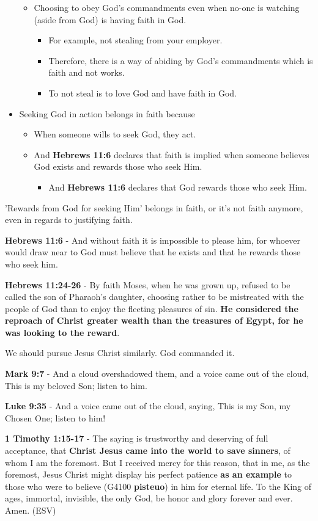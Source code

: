 \documentclass[11pt]{article}
\begin{document}
\begin{itemize}
\begin{itemize}
\item Choosing to obey God's commandments even when no-one is watching (aside from God) is having faith in God.
\begin{itemize}
\item For example, not stealing from your employer.
\item Therefore, there is a way of abiding by God's commandments which is faith and not works.
\item To not steal is to love God and have faith in God.
\end{itemize}
\end{itemize}
\item Seeking God in action belongs in faith because
\begin{itemize}
\item When someone wills to seek God, they act.
\item And \textbf{Hebrews 11:6} declares that faith is implied when someone believes God exists and rewards those who seek Him.
\begin{itemize}
\item And \textbf{Hebrews 11:6} declares that God rewards those who seek Him.
\end{itemize}
\end{itemize}
\end{itemize}

'Rewards from God for seeking Him' belongs in faith, or it's not faith anymore, even in regards to justifying faith.

\textbf{Hebrews 11:6} - And without faith it is impossible to please him, for whoever would draw near to God must believe that he exists and that he rewards those who seek him.

\textbf{Hebrews 11:24-26} - By faith Moses, when he was grown up, refused to be called the son of Pharaoh's daughter, choosing rather to be mistreated with the people of God than to enjoy the fleeting pleasures of sin. \textbf{He considered the reproach of Christ greater wealth than the treasures of Egypt, for he was looking to the reward}.

We should pursue Jesus Christ similarly. God commanded it.

\textbf{Mark 9:7} - And a cloud overshadowed them, and a voice came out of the cloud, This is my beloved Son; listen to him.

\textbf{Luke 9:35} - And a voice came out of the cloud, saying, This is my Son, my Chosen One; listen to him!

\textbf{1 Timothy 1:15-17} - The saying is trustworthy and deserving of full acceptance, that \textbf{Christ Jesus came into the world to save sinners}, of whom I am the foremost. But I received mercy for this reason, that in me, as the foremost, Jesus Christ might display his perfect patience \textbf{as an example} to those who were to believe (G4100 \textbf{pisteuo}) in him for eternal life. To the King of ages, immortal, invisible, the only God, be honor and glory forever and ever. Amen. (ESV)
\end{document}
